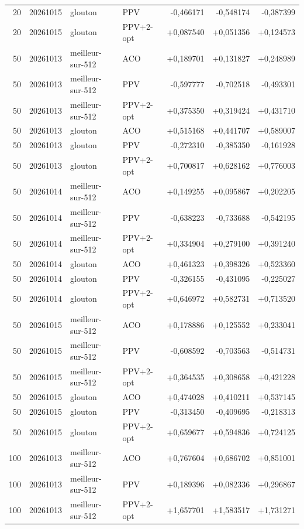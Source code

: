 \documentclass[12pt, a4paper, twoside, openright]{book}
\begin{document}
\begin{longtable}{r r l l r r r}
20 & 20261015 & glouton & PPV & -0,466171 & -0,548174 & -0,387399 \\
20 & 20261015 & glouton & PPV+2-opt & +0,087540 & +0,051356 & +0,124573 \\
50 & 20261013 & meilleur-sur-512 & ACO & +0,189701 & +0,131827 & +0,248989 \\
50 & 20261013 & meilleur-sur-512 & PPV & -0,597777 & -0,702518 & -0,493301 \\
50 & 20261013 & meilleur-sur-512 & PPV+2-opt & +0,375350 & +0,319424 & +0,431710 \\
50 & 20261013 & glouton & ACO & +0,515168 & +0,441707 & +0,589007 \\
50 & 20261013 & glouton & PPV & -0,272310 & -0,385350 & -0,161928 \\
50 & 20261013 & glouton & PPV+2-opt & +0,700817 & +0,628162 & +0,776003 \\
50 & 20261014 & meilleur-sur-512 & ACO & +0,149255 & +0,095867 & +0,202205 \\
50 & 20261014 & meilleur-sur-512 & PPV & -0,638223 & -0,733688 & -0,542195 \\
50 & 20261014 & meilleur-sur-512 & PPV+2-opt & +0,334904 & +0,279100 & +0,391240 \\
50 & 20261014 & glouton & ACO & +0,461323 & +0,398326 & +0,523360 \\
50 & 20261014 & glouton & PPV & -0,326155 & -0,431095 & -0,225027 \\
50 & 20261014 & glouton & PPV+2-opt & +0,646972 & +0,582731 & +0,713520 \\
50 & 20261015 & meilleur-sur-512 & ACO & +0,178886 & +0,125552 & +0,233041 \\
50 & 20261015 & meilleur-sur-512 & PPV & -0,608592 & -0,703563 & -0,514731 \\
50 & 20261015 & meilleur-sur-512 & PPV+2-opt & +0,364535 & +0,308658 & +0,421228 \\
50 & 20261015 & glouton & ACO & +0,474028 & +0,410211 & +0,537145 \\
50 & 20261015 & glouton & PPV & -0,313450 & -0,409695 & -0,218313 \\
50 & 20261015 & glouton & PPV+2-opt & +0,659677 & +0,594836 & +0,724125 \\
100 & 20261013 & meilleur-sur-512 & ACO & +0,767604 & +0,686702 & +0,851001 \\
100 & 20261013 & meilleur-sur-512 & PPV & +0,189396 & +0,082336 & +0,296867 \\
100 & 20261013 & meilleur-sur-512 & PPV+2-opt & +1,657701 & +1,583517 & +1,731271 \\

\end{longtable}
\end{document}

